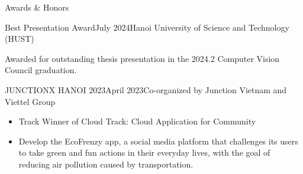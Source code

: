 \documentclass{resume} %
\newcommand{\plainitem}[1]{\item{#1}}
\begin{document}

    













\begin{rSection}{Awards \& Honors}

\begin{rSubsectionNoBullet}{Best Presentation Award}{July 2024}{Hanoi University of Science and Technology (HUST)}{}
    \plainitem{Awarded for outstanding thesis presentation in the 2024.2 Computer Vision Council graduation.}
\end{rSubsectionNoBullet}
\begin{rSubsectionNoBullet}{JUNCTIONX HANOI 2023}{April 2023}{Co-organized by Junction Vietnam and Viettel Group}{}
\item{
    \begin{itemize}
        \item Track Winner of Cloud Track: Cloud Application for Community
         \item{Develop the EcoFrenzy app, a social media platform that challenges its users to take green and fun actions in their everyday lives, with the goal of reducing air pollution caused by transportation.}
    \end{itemize}
}
   
\end{rSubsectionNoBullet}

\end{rSection}
\end{document}

